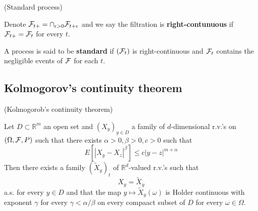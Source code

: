    \begin{definition}
        (Standard process)\par
        Denote $\mathcal{F}_{t+} = \cap_{\epsilon > 0} \mathcal{F}_{t+\epsilon}$ and we say the filtration is \textbf{right-contunuous} if $\mathcal{F}_{t+} = \mathcal{F}_t$ for every $t$.\par
        A process is said to be \textbf{standard} if $(\mathcal{F}_t)$ is right-continuous and $\mathcal{F}_t$ contains the negligible events of $\mathcal{F}$ for each $t$.
    \end{definition}

    \subsection{Kolmogorov's continuity theorem}

    \begin{theorem}
        (Kolmogorob's continuity theorem)\par
        Let $D\subset \mathbb{R}^m$ an open set and $(X_y)_{y\in D}$ a family of $d$-dimensional r.v.'s on $(\Omega,\mathcal{F},P)$ such that there exists $\alpha > 0, \beta > 0, c>0$ such that
        \[
        E[|X_y - X_z|^{\beta}] \leq c|y-z|^{m+\alpha}
        \]
        Then there exists a family $(\widetilde{X}_y)_t$ of $\mathbb{R}^d$-valued r.v.'s such that
        \[X_y = \widetilde{X}_y\]
        a.s. for every $y\in D$ and that the map $y\mapsto \widetilde{X}_y(\omega)$ is Holder continuous with exponent $\gamma$ for every $\gamma < \alpha/\beta$ on every compaact subset of $D$ for every $\omega \in \Omega$.
    \end{theorem}